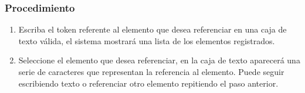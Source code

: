 \subsubsection{Procedimiento}
\begin{enumerate}
	\item Escriba el token referente al elemento que desea referenciar en una caja de texto válida, el sistema mostrará una lista de los elementos registrados.
	
	\item Seleccione el elemento que desea referenciar, en la caja de texto aparecerá una serie de caracteres que representan la referencia al elemento. Puede 
	seguir escribiendo texto o referenciar otro elemento repitiendo el paso anterior.
\end{enumerate}